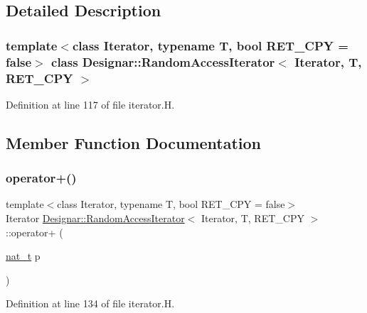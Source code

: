 \subsection{Detailed Description}
\subsubsection*{template$<$class Iterator, typename T, bool R\+E\+T\+\_\+\+C\+PY = false$>$\newline
class Designar\+::\+Random\+Access\+Iterator$<$ Iterator, T, R\+E\+T\+\_\+\+C\+P\+Y $>$}



Definition at line 117 of file iterator.\+H.



\subsection{Member Function Documentation}
\mbox{\label{class_designar_1_1_random_access_iterator_af5b2b9cab5cf3ac48cbc712c24f02c97}} 
\subsubsection{\texorpdfstring{operator+()}{operator+()}}
{\footnotesize\ttfamily template$<$class Iterator, typename T, bool R\+E\+T\+\_\+\+C\+PY = false$>$ \\
Iterator \hyperlink{class_designar_1_1_random_access_iterator}{Designar\+::\+Random\+Access\+Iterator}$<$ Iterator, T, R\+E\+T\+\_\+\+C\+PY $>$\+::operator+ (\begin{DoxyParamCaption}\item[{\hyperlink{namespace_designar_aa72662848b9f4815e7bf31a7cf3e33d1}{nat\+\_\+t}}]{p }\end{DoxyParamCaption})\hspace{0.3cm}{\ttfamily [inline]}}



Definition at line 134 of file iterator.\+H.

\mbox{\label{class_designar_1_1_random_access_iterator_aad12a146046f6463476453b3aac61359}} 
